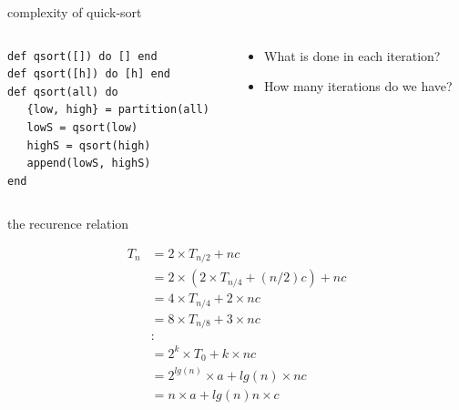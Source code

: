 \begin{frame}[fragile]{complexity of quick-sort}

\begin{columns}
   \begin{column}{.6\linewidth}
    \begin{verbatim}
def qsort([]) do [] end
def qsort([h]) do [h] end
def qsort(all) do 
   {low, high} = partition(all)
   lowS = qsort(low)
   highS = qsort(high)
   append(lowS, highS)
end
    \end{verbatim}
   \end{column}
   \begin{column}{.4\linewidth}
    \begin{itemize}
      \pause \item What is done in each iteration?
      \pause \item How many iterations do we have?       
    \end{itemize}
   \end{column}
\end{columns}


\end{frame}

\begin{frame}{the recurence relation}

  \begin{equation}  
  \begin{split}
T_n & = 2 \times T_{n/2} + nc \\
    & = 2 \times ( 2 \times T_{n/4} + (n/2)c ) + nc \\
    & = 4 \times T_{n/4} + 2 \times nc\\
    & = 8 \times T_{n/8} + 3 \times nc\\
    & : \\
    & = 2^k \times T_0 + k \times nc \\
    & = 2^{lg(n)} \times a  + lg(n) \times nc \\
    & = n \times a + lg(n)n \times c\\
  \end{split} 
\end{equation}


\end{frame}


